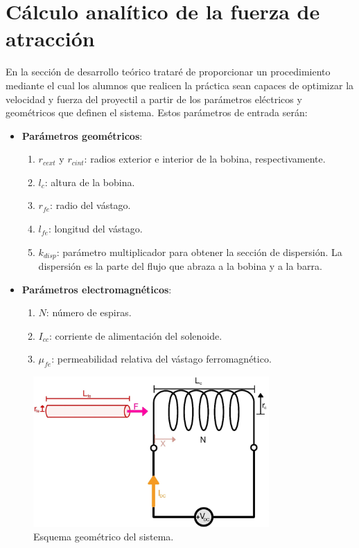 \section{Cálculo analítico de la fuerza de atracción}
\label{sec:analitico}
En la sección de desarrollo teórico trataré de proporcionar un procedimiento mediante el cual los alumnos que realicen la práctica sean capaces de optimizar la velocidad y fuerza del proyectil a partir de los parámetros eléctricos y geométricos que definen el sistema. Estos parámetros de entrada serán:
\begin{itemize}
    \item \textbf{Parámetros geométricos}:
    \begin{enumerate}[label=\alph*., leftmargin=*, itemindent=1em]
        \item \(r_{cext}\) y \(r_{cint} \): radios exterior e interior de la bobina, respectivamente.
        \item \(l_c\): altura de la bobina.
        \item \(r_{fe}\): radio del vástago.
        \item \(l_{fe}\): longitud del vástago.
        \item \(k_{disp}\): parámetro multiplicador para obtener la sección de dispersión. La dispersión es la parte del flujo que abraza a la bobina y a la barra.
    \end{enumerate}
    \item \textbf{Parámetros electromagnéticos}:
    \begin{enumerate}[label=\alph*., leftmargin=*, itemindent=1em]
        \item \(N\): número de espiras.
        \item \(I_{cc}\): corriente de alimentación del solenoide.
        \item \(\mu_{fe}\): permeabilidad relativa del vástago ferromagnético.
    \end{enumerate}
\end{itemize}

\begin{figure}[H]
    \centering 
    \includegraphics[width=9cm]{FigurasMemoria/esquemaDesTeor.jpg}
    \caption{Esquema geométrico del sistema.}
    \label{fig:esquemaDesTeor} %
\end{figure}

